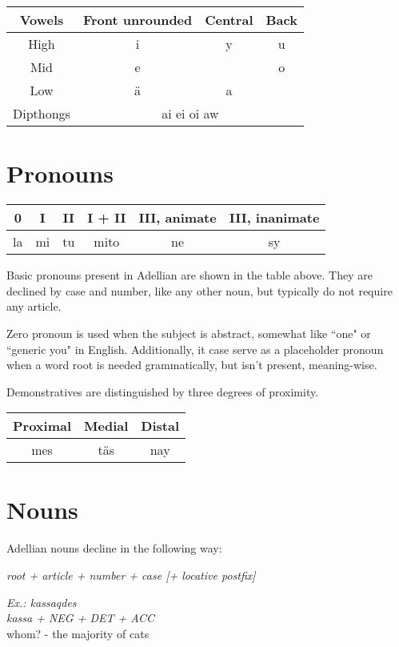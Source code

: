 \documentclass[12pt]{article}
\newcommand{\example}[3]{
	\colorbox{light-gray}{
		\parbox{5in}{
			\emph{Ex.: #1}\\
				  \emph{#2}\\
				  #3
		  }
	}
}
\begin{document}
	\begin{tabular}{|| c | c c c || }
		\hline
		Vowels & Front unrounded & Central & Back \\
		\hline
		High & i & y & u \\
		Mid & e &  & o \\
		Low & ä & a & \\
		Dipthongs & \multicolumn{3}{c||}{ai ei oi aw} \\
		\hline
	\end{tabular}

	\section{Pronouns}

	\begin{tabular}{|| c | c | c | c | c | c ||}
		\hline
		0 & I & II & I + II & III, animate & III, inanimate\\
		\hline
		la & mi & tu & mito & ne & sy\\
		\hline
	\end{tabular}

	Basic pronouns present in Adellian are shown in the table above. They are declined by case and number, like any other noun, but typically do not require any article.
	
	Zero pronoun is used when the subject is abstract, somewhat like ``one" or ``generic you" in English. Additionally, it case serve as a placeholder pronoun when a word root is needed grammatically, but isn't present, meaning-wise.

	Demonstratives are distinguished by three degrees of proximity.

	\begin{tabular}{|| c | c | c ||}
		\hline
		Proximal & Medial & Distal \\
		\hline
		mes & täs &  nay \\
		\hline
	\end{tabular}

	\section{Nouns}
	
	Adellian nouns decline in the following way:
	
	\emph{root + article + number + case [+ locative postfix]}
	
	\example {kassaqdes}
			 {kassa + NEG + DET + ACC}
		 	 {whom? - the majority of cats}
	
\end{document}
